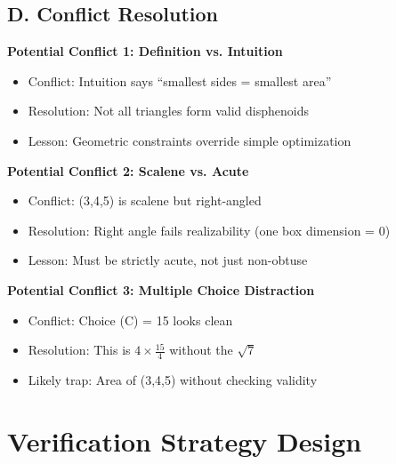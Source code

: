 \documentclass[12pt]{article}
\begin{document}
\begin{techniquesbox}
\subsection*{D. Conflict Resolution}

\textbf{Potential Conflict 1: Definition vs. Intuition}
\begin{itemize}
    \item Conflict: Intuition says ``smallest sides = smallest area''
    \item Resolution: Not all triangles form valid disphenoids
    \item Lesson: Geometric constraints override simple optimization
\end{itemize}

\textbf{Potential Conflict 2: Scalene vs. Acute}
\begin{itemize}
    \item Conflict: (3,4,5) is scalene but right-angled
    \item Resolution: Right angle fails realizability (one box dimension = 0)
    \item Lesson: Must be strictly acute, not just non-obtuse
\end{itemize}

\textbf{Potential Conflict 3: Multiple Choice Distraction}
\begin{itemize}
    \item Conflict: Choice (C) = 15 looks clean
    \item Resolution: This is $4 \times \frac{15}{4}$ without the $\sqrt{7}$
    \item Likely trap: Area of (3,4,5) without checking validity
\end{itemize}

\end{techniquesbox}

\section{Verification Strategy Design}
\end{document}
